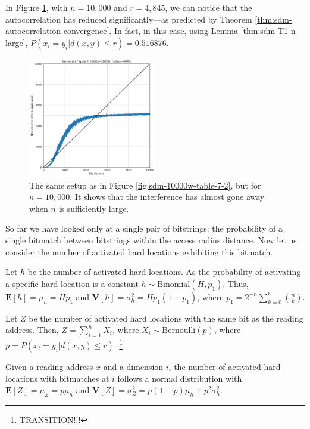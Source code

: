 In Figure \ref{fig:sdm-10kbits-figure-7-3}, with $n=10,000$ and $r=4,845$, we can notice that the autocorrelation has reduced significantly---as predicted by Theorem \ref{thm:sdm-autocorrelation-convergence}. In fact, in this case, using Lemma \ref{thm:sdm-T1-n-large}, $P(x_i = y_i | d(x, y) \le r) = 0.516876$.

\begin{figure}[!htb]
  \centering
  \includegraphics[width=0.5\textwidth]{./images02/sdm-10000bits-10000w-table-7-2.png}

  \caption{The same setup as in Figure \ref{fig:sdm-10000w-table-7-2}, but for $n=10,000$. It shows that the interference has almost gone away when $n$ is sufficiently large.}
  \label{fig:sdm-10kbits-figure-7-3}
\end{figure}

So far we have looked only at a single pair of bitstrings: the probability of a single bitmatch between bitstrings within the access radius distance.  Now let us consider the number of activated hard locations exhibiting this bitmatch.

Let $h$ be the number of activated hard locations. As the probability of activating a specific hard location is a constant $h \sim \text{Binomial}(H, p_1)$. Thus, $\mathbf{E}[h] = \mu_h = Hp_1$ and $\mathbf{V}[h] = \sigma^2_h = Hp_1(1-p_1)$, where $p_1 = 2^{-n} \sum_{k=0}^{r} \binom{n}{k}$.

Let $Z$ be the number of activated hard locations with the same bit as the reading address. Then, $Z = \sum_{i=1}^{h} X_i$, where $X_i \sim \text{Bernoulli}(p)$, where $p = P(x_i = y_i | d(x, y) \le r)$.  \footnote{TRANSITION!!!}

\begin{theorem}
Given a reading address $x$ and a dimension $i$, the number of activated hard-locations with bitmatches at $i$ follows a normal distribution with $\mathbf{E}[Z] = \mu_Z = p \mu_h$ and $\mathbf{V}[Z] = \sigma_Z^2 = p(1-p) \mu_h + p^2 \sigma^2_h$.
\label{T2}
\end{theorem}

